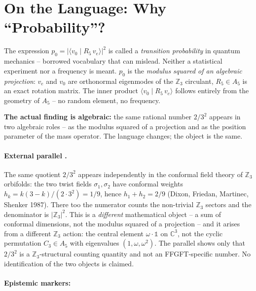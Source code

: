 \section*{On the Language: Why ``Probability''?}

The expression $p_0 = |\langle v_0 \mid R_5\, v_e\rangle|^2$ is called a
\emph{transition probability} in quantum mechanics -- borrowed vocabulary
that can mislead. Neither a statistical experiment nor a frequency is meant.
$p_0$ is the \emph{modulus squared of an algebraic projection}: $v_e$ and
$v_0$ are orthonormal eigenmodes of the $\mathbb{Z}_3$ circulant, $R_5\in A_5$
is an exact rotation matrix. The inner product $\langle v_0\mid R_5\,v_e\rangle$
follows entirely from the geometry of $A_5$ -- no random element, no frequency.

\textbf{The actual finding is algebraic:} the same rational number $2/3^2$
appears in two algebraic roles -- as the modulus squared of a projection and
as the position parameter of the mass operator.
The language changes; the object is the same.

\paragraph{External parallel \EM.}
The same quotient $2/3^2$ appears independently in the conformal field
theory of $\mathbb{Z}_3$ orbifolds: the two twist fields $\sigma_1,\sigma_2$
have conformal weights $h_k = k(3-k)/(2\cdot3^2) = 1/9$, hence
$h_1+h_2 = 2/9$ (Dixon, Friedan, Martinec, Shenker 1987). There too the
numerator counts the non-trivial $\mathbb{Z}_3$ sectors and the denominator
is $|\mathbb{Z}_3|^2$. This is a \emph{different} mathematical object --
a sum of conformal dimensions, not the modulus squared of a projection --
and it arises from a different $\mathbb{Z}_3$ action: the central element
$\omega\cdot\mathbb{1}$ on $\mathbb{C}^3$, not the cyclic permutation
$C_3\in A_5$ with eigenvalues $(1,\omega,\omega^2)$. The parallel shows only
that $2/3^2$ is a $\mathbb{Z}_3$-structural counting quantity and not an
FFGFT-specific number. No identification of the two objects is claimed.



\paragraph*{Epistemic markers:}\mbox{}\\[2pt]



